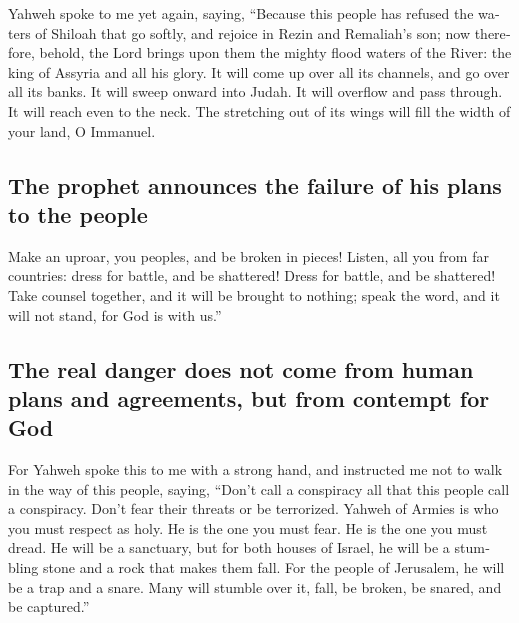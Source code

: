 \begin{paracol}{2}
\begin{otherlanguage}{english}
 Yahweh spoke to me yet again, saying, 
``Because this people has refused the waters of Shiloah that go softly,
and rejoice in Rezin and Remaliah's son;  now therefore,
behold, the Lord brings upon them the mighty flood waters of the River:
the king of Assyria and all his glory. It will come up over all its
channels, and go over all its banks.  It will sweep onward
into Judah. It will overflow and pass through. It will reach even to the
neck. The stretching out of its wings will fill the width of your land,
O Immanuel.

\hypertarget{the-prophet-announces-the-failure-of-his-plans-to-the-people}{%
\subsection{The prophet announces the failure of his plans to the
people}\label{the-prophet-announces-the-failure-of-his-plans-to-the-people}}

 Make an uproar, you peoples, and be broken in pieces!
Listen, all you from far countries: dress for battle, and be shattered!
Dress for battle, and be shattered!  Take counsel
together, and it will be brought to nothing; speak the word, and it will
not stand, for God is with us.''

\hypertarget{the-real-danger-does-not-come-from-human-plans-and-agreements-but-from-contempt-for-god}{%
\subsection{The real danger does not come from human plans and
agreements, but from contempt for
God}\label{the-real-danger-does-not-come-from-human-plans-and-agreements-but-from-contempt-for-god}}

 For Yahweh spoke this to me with a strong hand, and
instructed me not to walk in the way of this people, saying,
 ``Don't call a conspiracy all that this people call a
conspiracy. Don't fear their threats or be terrorized. 
Yahweh of Armies is who you must respect as holy. He is the one you must
fear. He is the one you must dread.  He will be a
sanctuary, but for both houses of Israel, he will be a stumbling stone
and a rock that makes them fall. For the people of Jerusalem, he will be
a trap and a snare.  Many will stumble over it, fall, be
broken, be snared, and be captured.''


\end{otherlanguage}
\end{paracol}
